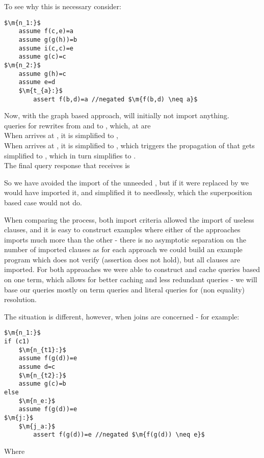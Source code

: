 To see why this is necessary consider:
\begin{lstlisting}[caption=propagation condition comparison,label=snippet3.13]
$\m{n_1:}$
	assume f(c,e)=a
	assume g(g(h))=b
	assume i(c,c)=e
	assume g(c)=c
$\m{n_2:}$
	assume g(h)=c
	assume e=d
	$\m{t_{a}:}$
		assert f(b,d)=a //negated $\m{f(b,d) \neq a}$
\end{lstlisting}

Now, with the graph based approach,  will initially not import anything.\\
 queries for rewrites from and to , which, at  are \\
When  arrives at , it is simplified to , \\
When  arrives at , it is simplified to , 
which triggers the propagation of  that gets simplified to , 
which in turn simplifies  to .\\
The final query response that  receives is 

So we have avoided the import of the unneeded , but if it were replaced by  we would have imported it, and simplified it to   needlessly, which the superposition based case would not do. 

When comparing the process, both import criteria allowed the import of useless clauses, and it is easy to construct examples where either of the approaches imports much more than the other - there is no asymptotic separation on the number of imported clauses as for each approach we could build an example program which does not verify (assertion does not hold), but all clauses are imported.
For both approaches we were able to construct and cache queries based on one term, which allows for better caching and less redundant queries - we will base our queries mostly on term queries and literal queries for (non equality) resolution.

The situation is different, however, when joins are concerned - for example: 
\begin{lstlisting}[caption=propagation condition comparison join,label=snippet3.14]
$\m{n_1:}$
if (c1)
	$\m{n_{t1}:}$
	assume f(g(d))=e
	assume d=c
	$\m{n_{t2}:}$
	assume g(c)=b
else
	$\m{n_e:}$
	assume f(g(d))=e
$\m{j:}$
	$\m{j_a:}$
		assert f(g(d))=e //negated $\m{f(g(d)) \neq e}$
\end{lstlisting}
Where 

